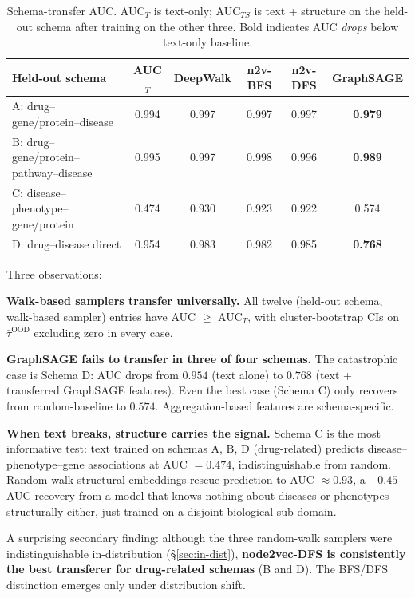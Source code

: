 \documentclass[11pt]{article}
\begin{document}
\begin{table}[h!]
\centering
\caption{Schema-transfer AUC. AUC$_T$ is text-only; AUC$_{TS}$ is text + structure on the held-out schema after training on the other three. Bold indicates AUC \emph{drops} below text-only baseline.}
\label{tab:transfer}
\small
\begin{tabular}{l c c c c c}
\toprule
Held-out schema & AUC$_T$ & DeepWalk & n2v-BFS & n2v-DFS & GraphSAGE \\
\midrule
A: drug--gene/protein--disease & 0.994 & 0.997 & 0.997 & 0.997 & \textbf{0.979} \\
B: drug--gene/protein--pathway--disease & 0.995 & 0.997 & 0.998 & 0.996 & \textbf{0.989} \\
C: disease--phenotype--gene/protein & 0.474 & 0.930 & 0.923 & 0.922 & 0.574 \\
D: drug--disease direct & 0.954 & 0.983 & 0.982 & 0.985 & \textbf{0.768} \\
\bottomrule
\end{tabular}
\end{table}

Three observations:

\textbf{Walk-based samplers transfer universally.} All twelve (held-out schema, walk-based sampler) entries have AUC $\geq$ AUC$_T$, with cluster-bootstrap CIs on $\bar\tau^{\mathrm{OOD}}$ excluding zero in every case.

\textbf{GraphSAGE fails to transfer in three of four schemas.} The catastrophic case is Schema D: AUC drops from $0.954$ (text alone) to $0.768$ (text + transferred GraphSAGE features). Even the best case (Schema C) only recovers from random-baseline to $0.574$. Aggregation-based features are schema-specific.

\textbf{When text breaks, structure carries the signal.} Schema C is the most informative test: text trained on schemas A, B, D (drug-related) predicts disease--phenotype--gene associations at AUC $= 0.474$, indistinguishable from random. Random-walk structural embeddings rescue prediction to AUC $\approx 0.93$, a $+0.45$ AUC recovery from a model that knows nothing about diseases or phenotypes structurally either, just trained on a disjoint biological sub-domain.

A surprising secondary finding: although the three random-walk samplers were indistinguishable in-distribution (\S\ref{sec:in-dist}), \textbf{node2vec-DFS is consistently the best transferer for drug-related schemas} (B and D). The BFS/DFS distinction emerges only under distribution shift.
\end{document}

